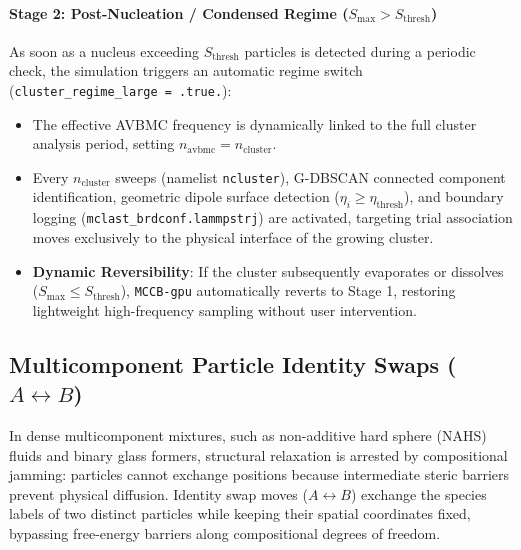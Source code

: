 \documentclass[final,5p,times,twocolumn]{elsarticle}
\begin{document}
\paragraph{Stage 2: Post-Nucleation / Condensed Regime ($S_{\max} > S_{\text{thresh}}$)}
As soon as a nucleus exceeding $S_{\text{thresh}}$ particles is detected during a periodic check, the simulation triggers an automatic regime switch (\texttt{cluster\_regime\_large = .true.}):
\begin{itemize}
    \item The effective AVBMC frequency is dynamically linked to the full cluster analysis period, setting $n_{\text{avbmc}} = n_{\text{cluster}}$.
    \item Every $n_{\text{cluster}}$ sweeps (namelist \texttt{ncluster}), \textsc{G-DBSCAN} connected component identification, geometric dipole surface detection ($\eta_i \ge \eta_{\text{thresh}}$), and boundary logging (\texttt{mclast\_brdconf.lammpstrj}) are activated, targeting trial association moves exclusively to the physical interface of the growing cluster.
    \item \textbf{Dynamic Reversibility}: If the cluster subsequently evaporates or dissolves ($S_{\max} \le S_{\text{thresh}}$), \texttt{MCCB-gpu} automatically reverts to Stage 1, restoring lightweight high-frequency sampling without user intervention.
\end{itemize}

\subsection{Multicomponent Particle Identity Swaps (\texorpdfstring{$A \leftrightarrow B$}{A <-> B})}
\label{sec:algo_swaps}

In dense multicomponent mixtures, such as non-additive hard sphere
(NAHS) fluids and binary glass formers, structural relaxation is
arrested by compositional jamming: particles cannot exchange positions
because intermediate steric barriers prevent physical
diffusion. Identity swap moves ($A \leftrightarrow B$) exchange the
species labels of two distinct particles while keeping their spatial
coordinates fixed, bypassing free-energy barriers along
compositional degrees of freedom. 
\end{document}
